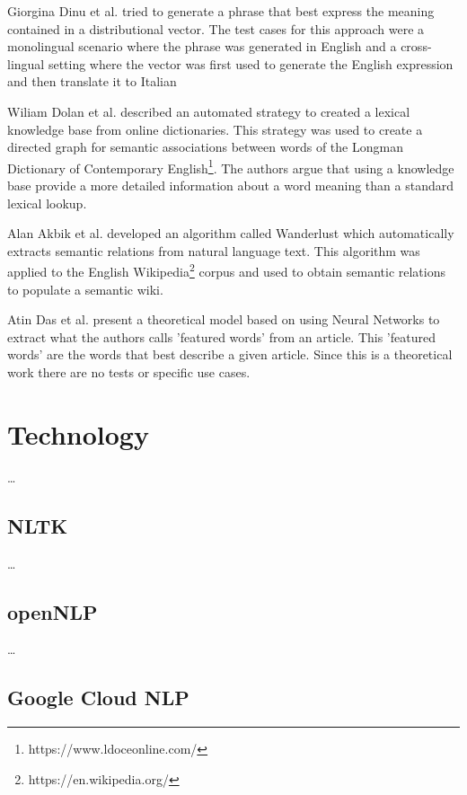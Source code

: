 Giorgina Dinu et al.\cite{dinu2014make} tried to generate a phrase that best express the meaning contained in a distributional vector.
The test cases for this approach were a monolingual scenario where the phrase was generated in English and a cross-lingual setting where the vector was first used to generate the English expression and then translate it to Italian

Wiliam Dolan et al.\cite{dolan1993automatically} described an automated strategy to created a lexical knowledge base from online dictionaries.
This strategy was used to create a directed graph for semantic associations between words of the Longman Dictionary of Contemporary English\footnote{https://www.ldoceonline.com/}.
The authors argue that using a knowledge base provide a more detailed information about a word meaning than a standard lexical lookup.

Alan Akbik et al.\cite{akbik2009wanderlust} developed an algorithm called Wanderlust which automatically extracts semantic relations from natural language text.
This algorithm was applied to the English Wikipedia\footnote{https://en.wikipedia.org/} corpus and used to obtain semantic relations to populate a semantic wiki.

Atin Das et al.\cite{das2008neural} present a theoretical model based on using Neural Networks to extract what the authors calls 'featured words' from an article.
This 'featured words' are the words that best describe a given article.
Since this is a theoretical work there are no tests or specific use cases.

\section{Technology}

\dots

\subsection{NLTK}

\dots

\subsection{openNLP}

\dots

\subsection{Google Cloud NLP}

